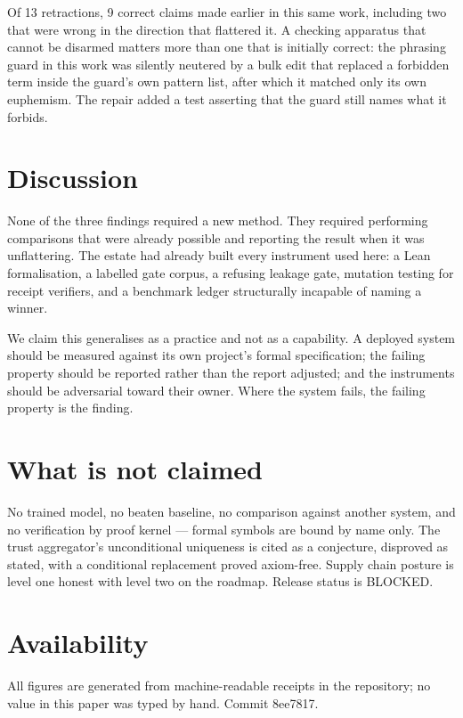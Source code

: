 \documentclass[11pt]{article}
\begin{document}
Of 13 retractions, 9 correct claims made earlier in this same work,
including two that were wrong in the direction that flattered it. A checking apparatus that cannot be
disarmed matters more than one that is initially correct: the phrasing guard in this work was silently
neutered by a bulk edit that replaced a forbidden term inside the guard's own pattern list, after which
it matched only its own euphemism. The repair added a test asserting that the guard still names what it
forbids.

\section{Discussion}
None of the three findings required a new method. They required performing comparisons that were already
possible and reporting the result when it was unflattering. The estate had already built every instrument
used here: a Lean formalisation, a labelled gate corpus, a refusing leakage gate, mutation testing for
receipt verifiers, and a benchmark ledger structurally incapable of naming a winner.

We claim this generalises as a practice and not as a capability. A deployed system should be measured
against its own project's formal specification; the failing property should be reported rather than the
report adjusted; and the instruments should be adversarial toward their owner. Where the system fails,
the failing property is the finding.

\section*{What is not claimed}
No trained model, no beaten baseline, no comparison against another system, and no verification by proof
kernel --- formal symbols are bound by name only. The trust aggregator's unconditional uniqueness is
cited as a conjecture, disproved as stated, with a conditional replacement proved axiom-free. Supply
chain posture is level one honest with level two on the roadmap. Release status is BLOCKED.

\section*{Availability}
All figures are generated from machine-readable receipts in the repository; no value in this paper was
typed by hand. Commit 8ee7817.
\end{document}
